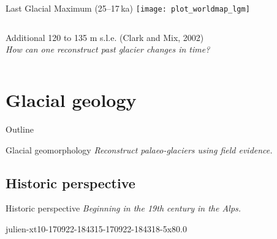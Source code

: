     \begin{frame}{Last Glacial Maximum (25--17\,ka)}
      \texttt{[image: plot\_worldmap\_lgm]}\\
      \bigskip
      \begin{columns}  %
        \column{120mm}
          \centering
          Additional 120 to 135 m s.l.e. (Clark and Mix, 2002)\pause\\
          \emph{How can one reconstruct past glacier changes in time?}
      \end{columns}
    \end{frame}


\section{Glacial geology}

    \begin{sectionframe}{Outline}
      \begin{multicols}{2}
        \tableofcontents
      \end{multicols}
    \end{sectionframe}

    \begin{sectionframe}{Glacial geomorphology}
      \emph{Reconstruct palaeo-glaciers using field evidence.}
    \end{sectionframe}

\subsection{Historic perspective}

    \begin{sectionframe}{Historic perspective}
      \emph{Beginning in the 19th century in the Alps.}
    \end{sectionframe}


    \begin{backgroundframe}[b]{julien-xt10-170922-184315-170922-184318-5x8}{0.0}{}
    \end{backgroundframe}

